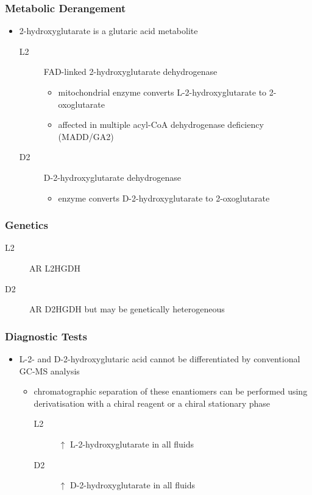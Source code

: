 \documentclass[12pt]{scrartcl}
\begin{document}
\begin{center}
\begin{center}
\subsubsection{Metabolic Derangement}
\label{sec:orgd23b241}
\begin{itemize}
\item 2-hydroxyglutarate is a glutaric acid metabolite 
\begin{description}
\item[{L2}] FAD-linked 2-hydroxyglutarate dehydrogenase
\begin{itemize}
\item mitochondrial enzyme converts L-2-hydroxyglutarate to
2-oxoglutarate
\item affected in multiple acyl-CoA dehydrogenase deficiency (MADD/GA2)
\end{itemize}
\item[{D2}] D-2-hydroxyglutarate dehydrogenase
\begin{itemize}
\item enzyme converts D-2-hydroxyglutarate to 2-oxoglutarate
\end{itemize}
\end{description}
\end{itemize}

\subsubsection{Genetics}
\label{sec:org6a366e1}
\begin{description}
\item[{L2}] AR L2HGDH
\item[{D2}] AR D2HGDH but may be genetically heterogeneous
\end{description}

\subsubsection{Diagnostic Tests}
\label{sec:org366fba6}
\begin{itemize}
\item L-2- and D-2-hydroxyglutaric acid cannot be differentiated by
conventional GC-MS analysis
\begin{itemize}
\item chromatographic separation of these enantiomers can be performed
using derivatisation with a chiral reagent or a chiral stationary
phase
\begin{description}
\item[{L2}] \(\uparrow\) L-2-hydroxyglutarate in all fluids
\item[{D2}] \(\uparrow\) D-2-hydroxyglutarate in all fluids
\end{description}
\end{itemize}
\end{itemize}


\end{center}
\end{center}
\end{document}
